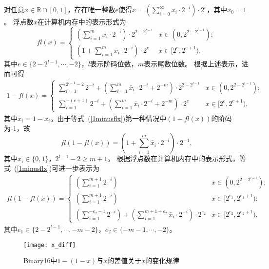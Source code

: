 对任意$x \in \mathbb{R}\cap [0, 1]$，存在唯一整数$e$使得$x=(\sum_{i=0}^\infty x_i\cdot 2^{-i})\cdot 2^e$，其中$x_0=1$。
浮点数$x$在计算机内存中的表示形式为
\begin{equation}
\mathit{fl}(x)=
\begin{cases}
(\sum_{i=1}^{m} x_i\cdot 2^{-i})\cdot 2^{2-2^{l-1}}  &  x\in (0,2^{2-2^{l-1}}); \\
(1+\sum_{i=1}^{m} x_i\cdot 2^{-i})\cdot 2^e          &  x\in [2^e,2^{e+1}),
\end{cases}
\end{equation}
其中$e\in \{2-2^{l-1}, \cdots, -2\}$，$l$表示阶码位数，$m$表示尾数位数。
根据上述表示，进而可得
\begin{eqnarray}
1-\mathit{fl}(x)=
\begin{cases}
\sum_{i=1}^{2^{l-1}-2} 2^{-i}+(\sum_{i=1}^{m} \bar{x}_i\cdot 2^{-i}+ 2^{-m})\cdot 2^{2-2^{l-1}} &  x\in (0,2^{2-2^{l-1}}); \\
\sum_{i=1}^{-(e+1)}2^{-i}+(\sum_{i=1}^{m} \bar{x}_i\cdot 2^{-i}+ 2^{-m} )\cdot 2^{e}            &  x\in [2^e,2^{e+1}),
\end{cases}
\label{1minusflx}
\end{eqnarray}
其中$\bar{x}_i=1-x_i$。由于等式~(\ref{1minusflx})第一种情况中$(1-\mathit{fl}(x))$的阶码为-1，故
\begin{equation}
\mathit{fl}( 1-\mathit{fl}(x))= \left(1+\sum_{i=1}^m \hat{x}_i\cdot 2^{-i} \right)\cdot 2^{-1},
\end{equation}
其中$\hat{x}_i\in\{0, 1\}$，$2^{l-1}-2\ge m+1$。
根据浮点数在计算机内存中的表示形式，等式~(\ref{1minusflx})可进一步表示为
\begin{eqnarray}
\mathit{fl}(1-\mathit{fl}(x))=
\begin{cases}
(\sum_{i=1}^{m+1} 2^{-i})                &   x\in (0,2^{2-2^{l-1}});   \\
(\sum_{i=1}^{m+1} 2^{-i})                &   x\in [2^{e_1},2^{e_1+1}); \\
(\sum_{i=1}^{-e_2-1} 2^{-i})+(\sum_{i=1}^{m+1+e_2} \bar{x}_i\cdot 2^{-i} )\cdot 2^{e_2}    &   x\in [2^{e_2},2^{e_2+1}),
\end{cases}
\label{fl1minusfx}
\end{eqnarray}
其中$e_1\in \{2-2^{l-1}, \cdots, -m-2\}$，$e_2\in \{-m-1, \cdots, -2\}$。

\begin{figure}[!htb]
\centering
\begin{minipage}{1.25\BigOneImW}
\centering
\texttt{[image: x\_diff]}
\end{minipage}
\caption{Binary16中$1-(1-x)$与$x$的差值关于$x$的变化规律}
\label{fig:differencex}
\end{figure}

